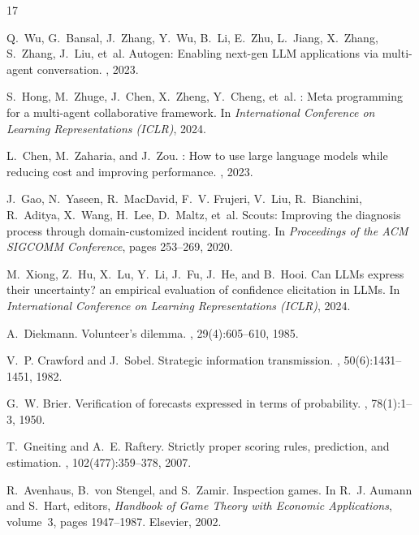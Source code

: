 \documentclass{article}
\theoremstyle{definition}
\begin{document}
\begin{thebibliography}{17}

Q.~Wu, G.~Bansal, J.~Zhang, Y.~Wu, B.~Li, E.~Zhu, L.~Jiang, X.~Zhang, S.~Zhang, J.~Liu, et~al.
\newblock Autogen: Enabling next-gen {LLM} applications via multi-agent conversation.
, 2023.

S.~Hong, M.~Zhuge, J.~Chen, X.~Zheng, Y.~Cheng, et~al.
: Meta programming for a multi-agent collaborative framework.
\newblock In {\em International Conference on Learning Representations (ICLR)}, 2024.

L.~Chen, M.~Zaharia, and J.~Zou.
: How to use large language models while reducing cost and improving performance.
, 2023.

J.~Gao, N.~Yaseen, R.~MacDavid, F.~V. Frujeri, V.~Liu, R.~Bianchini, R.~Aditya, X.~Wang, H.~Lee, D.~Maltz, et~al.
\newblock Scouts: Improving the diagnosis process through domain-customized incident routing.
\newblock In {\em Proceedings of the ACM SIGCOMM Conference}, pages 253--269, 2020.

M.~Xiong, Z.~Hu, X.~Lu, Y.~Li, J.~Fu, J.~He, and B.~Hooi.
\newblock Can {LLMs} express their uncertainty? an empirical evaluation of confidence elicitation in {LLMs}.
\newblock In {\em International Conference on Learning Representations (ICLR)}, 2024.

A.~Diekmann.
\newblock Volunteer's dilemma.
, 29(4):605--610, 1985.

V.~P. Crawford and J.~Sobel.
\newblock Strategic information transmission.
, 50(6):1431--1451, 1982.

G.~W. Brier.
\newblock Verification of forecasts expressed in terms of probability.
, 78(1):1--3, 1950.

T.~Gneiting and A.~E. Raftery.
\newblock Strictly proper scoring rules, prediction, and estimation.
, 102(477):359--378, 2007.

R.~Avenhaus, B.~von Stengel, and S.~Zamir.
\newblock Inspection games.
\newblock In R.~J. Aumann and S.~Hart, editors, {\em Handbook of Game Theory with Economic Applications}, volume~3, pages 1947--1987. Elsevier, 2002.


\end{thebibliography}
\end{document}
